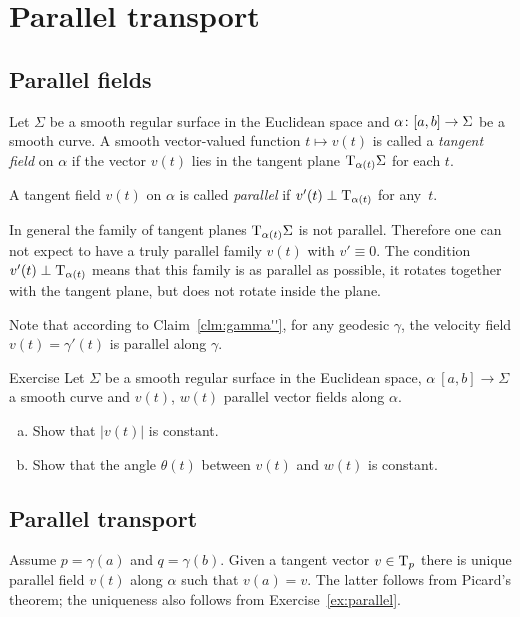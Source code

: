 \chapter{Parallel transport}

\section{Parallel fields}

Let $\Sigma$ be a smooth regular surface in the Euclidean space and $\alpha\:[a,b]\z\to \Sigma$ be a smooth curve.
A smooth vector-valued function $t\mapsto v(t)$ is called a \emph{tangent field} on $\alpha$ if
the vector $v(t)$ lies in the tangent plane $\mathrm{T}_{\alpha(t)}\Sigma$ for each $t$.

A tangent field $v(t)$ on $\alpha$ is called \emph{parallel} if $v'(t)\perp\mathrm{T}_{\alpha(t)}$ for any~$t$.

In general the family of tangent planes $\mathrm{T}_{\alpha(t)}\Sigma$ is not parallel.
Therefore one can not expect to have a truly parallel family $v(t)$ with $v'\equiv 0$.
The condition $v'(t)\perp\mathrm{T}_{\alpha(t)}$ means that this family is as parallel as possible, it rotates together with the tangent plane, but does not rotate inside the plane.

Note that according to Claim~\ref{clm:gamma''}, for any geodesic $\gamma$, the velocity field $v(t)=\gamma'(t)$ is parallel along $\gamma$.


\begin{thm}{Exercise}\label{ex:parallel}
Let $\Sigma$ be a smooth regular surface in the Euclidean space, 
$\alpha\:[a,b]\to \Sigma$ a smooth curve 
and $v(t)$, $w(t)$ parallel vector fields along $\alpha$.
\begin{enumerate}[(a)]
 \item Show that $|v(t)|$ is constant.
 \item Show that the angle $\theta(t)$ between $v(t)$ and $w(t)$ is constant.
\end{enumerate}
\end{thm}

\section{Parallel transport}

Assume $p=\gamma(a)$ and $q=\gamma(b)$.
Given a tangent vector $v\in\mathrm{T}_p$ there is unique parallel field $v(t)$ along $\alpha$ such that $v(a)=v$.
The latter follows from Picard's theorem; the uniqueness also follows from Exercise~\ref{ex:parallel}.

